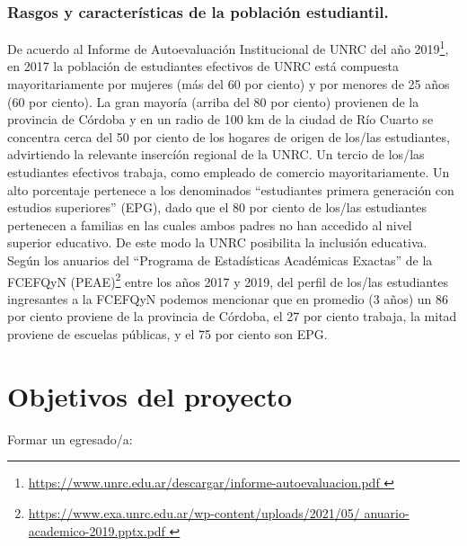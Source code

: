 \documentclass[a4paper, 12pt]{article}
\begin{document}
\subsubsection{Rasgos y características de la población estudiantil.}

De acuerdo al Informe de Autoevaluación Institucional de UNRC del
año 2019\footnote{\href{https://www.unrc.edu.ar/descargar/informe-autoevaluacion.pdf}{https://www.unrc.edu.ar/descargar/informe-autoevaluacion.pdf
}
}, en 2017 la población de estudiantes efectivos de UNRC está
compuesta mayoritariamente por mujeres (más del 60 por ciento) y por
menores de 25 años (60 por ciento). La gran mayoría (arriba del 80 por
ciento) provienen de la provincia de Córdoba y en un radio de 100 km
de la ciudad de Río Cuarto se concentra cerca del 50 por ciento de los
hogares de origen de los/las estudiantes, advirtiendo la relevante insercíón
regional de la UNRC. Un tercio de los/las estudiantes efectivos trabaja, como
empleado de comercio mayoritariamente. Un alto porcentaje pertenece
a los denominados “estudiantes primera generación con estudios superiores” (EPG), dado que el 80 por ciento de los/las estudiantes pertenecen
a familias en las cuales ambos padres no han accedido 
al nivel superior educativo. De este modo la UNRC posibilita la inclusión
educativa.
Según los anuarios del “Programa de Estadísticas Académicas Exactas” de la FCEFQyN (PEAE)\footnote{\href{
https://www.exa.unrc.edu.ar/wp-content/uploads/2021/05/
anuario-academico-2019.pptx.pdf
}{https://www.exa.unrc.edu.ar/wp-content/uploads/2021/05/
anuario-academico-2019.pptx.pdf
}} entre los años 2017 y 2019, del perfil de
los/las estudiantes ingresantes a la FCEFQyN podemos mencionar que en promedio (3 años) un 86 por ciento proviene de la provincia de Córdoba, el
27 por ciento trabaja, la mitad proviene de escuelas públicas, y el 75 por
ciento son EPG. 

\section{Objetivos del proyecto}


Formar un egresado/a:
\end{document}
